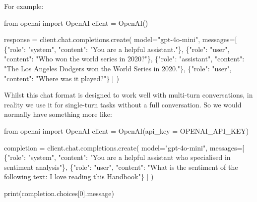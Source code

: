 \documentclass[
  letterpaper,
  DIV=11,
  numbers=noendperiod]{scrreprt}
\newenvironment{Shaded}{\begin{snugshade}}{\end{snugshade}}
\newcommand{\AttributeTok}[1]{\textcolor[rgb]{0.40,0.45,0.13}{#1}}
\newcommand{\DecValTok}[1]{\textcolor[rgb]{0.68,0.00,0.00}{#1}}
\newcommand{\FunctionTok}[1]{\textcolor[rgb]{0.28,0.35,0.67}{#1}}
\newcommand{\NormalTok}[1]{\textcolor[rgb]{0.00,0.23,0.31}{#1}}
\newcommand{\OtherTok}[1]{\textcolor[rgb]{0.00,0.23,0.31}{#1}}
\newcommand{\SpecialCharTok}[1]{\textcolor[rgb]{0.37,0.37,0.37}{#1}}
\newcommand{\StringTok}[1]{\textcolor[rgb]{0.13,0.47,0.30}{#1}}
\begin{document}
For example:

\begin{Shaded}
\begin{Highlighting}[]
\NormalTok{from openai import OpenAI}
\NormalTok{client }\OtherTok{=} \FunctionTok{OpenAI}\NormalTok{()}

\NormalTok{response }\OtherTok{=} \FunctionTok{client.chat.completions.create}\NormalTok{(}
  \AttributeTok{model=}\StringTok{"gpt{-}4o{-}mini"}\NormalTok{,}
  \AttributeTok{messages=}\NormalTok{[}
\NormalTok{    \{}\StringTok{"role"}\SpecialCharTok{:} \StringTok{"system"}\NormalTok{, }\StringTok{"content"}\SpecialCharTok{:} \StringTok{"You are a helpful assistant."}\NormalTok{\},}
\NormalTok{    \{}\StringTok{"role"}\SpecialCharTok{:} \StringTok{"user"}\NormalTok{, }\StringTok{"content"}\SpecialCharTok{:} \StringTok{"Who won the world series in 2020?"}\NormalTok{\},}
\NormalTok{    \{}\StringTok{"role"}\SpecialCharTok{:} \StringTok{"assistant"}\NormalTok{, }\StringTok{"content"}\SpecialCharTok{:} \StringTok{"The Los Angeles Dodgers won the World Series in 2020."}\NormalTok{\},}
\NormalTok{    \{}\StringTok{"role"}\SpecialCharTok{:} \StringTok{"user"}\NormalTok{, }\StringTok{"content"}\SpecialCharTok{:} \StringTok{"Where was it played?"}\NormalTok{\}}
\NormalTok{  ]}
\NormalTok{)}
\end{Highlighting}
\end{Shaded}

Whilst this chat format is designed to work well with multi-turn
conversations, in reality we use it for single-turn tasks without a full
conversation. So we would normally have something more like:

\begin{Shaded}
\begin{Highlighting}[]
\NormalTok{from openai import OpenAI}
\NormalTok{client }\OtherTok{=} \FunctionTok{OpenAI}\NormalTok{(}\AttributeTok{api\_key =}\NormalTok{ OPENAI\_API\_KEY)}

\NormalTok{completion }\OtherTok{=} \FunctionTok{client.chat.completions.create}\NormalTok{(}
    \AttributeTok{model=}\StringTok{"gpt{-}4o{-}mini"}\NormalTok{,}
    \AttributeTok{messages=}\NormalTok{[}
\NormalTok{        \{}\StringTok{"role"}\SpecialCharTok{:} \StringTok{"system"}\NormalTok{, }\StringTok{"content"}\SpecialCharTok{:} \StringTok{"You are a helpful assistant who specialised in sentiment analysis"}\NormalTok{\},}
\NormalTok{        \{}\StringTok{"role"}\SpecialCharTok{:} \StringTok{"user"}\NormalTok{, }\StringTok{"content"}\SpecialCharTok{:} \StringTok{"What is the sentiment of the following text: \textquotesingle{}I love reading this Handbook\textquotesingle{}"}\NormalTok{\}}
\NormalTok{    ]}
\NormalTok{)}

\FunctionTok{print}\NormalTok{(completion.choices[}\DecValTok{0}\NormalTok{].message)}
\end{Highlighting}
\end{Shaded}
\end{document}
